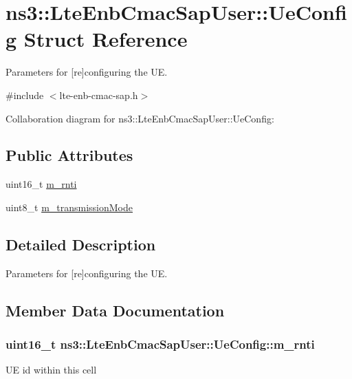 \hypertarget{structns3_1_1LteEnbCmacSapUser_1_1UeConfig}{}\section{ns3\+:\+:Lte\+Enb\+Cmac\+Sap\+User\+:\+:Ue\+Config Struct Reference}
\label{structns3_1_1LteEnbCmacSapUser_1_1UeConfig}


Parameters for \mbox{[}re\mbox{]}configuring the UE.  




{\ttfamily \#include $<$lte-\/enb-\/cmac-\/sap.\+h$>$}



Collaboration diagram for ns3\+:\+:Lte\+Enb\+Cmac\+Sap\+User\+:\+:Ue\+Config\+:
\subsection*{Public Attributes}
\begin{DoxyCompactItemize}
\item 
uint16\+\_\+t \hyperlink{structns3_1_1LteEnbCmacSapUser_1_1UeConfig_a763c88aae37375654fda021763d7ec85}{m\+\_\+rnti}
\item 
uint8\+\_\+t \hyperlink{structns3_1_1LteEnbCmacSapUser_1_1UeConfig_af5014d0254a641bc8bf84154aa4853e4}{m\+\_\+transmission\+Mode}
\end{DoxyCompactItemize}


\subsection{Detailed Description}
Parameters for \mbox{[}re\mbox{]}configuring the UE. 

\subsection{Member Data Documentation}
\subsubsection[{\texorpdfstring{m\+\_\+rnti}{m_rnti}}]{\setlength{\rightskip}{0pt plus 5cm}uint16\+\_\+t ns3\+::\+Lte\+Enb\+Cmac\+Sap\+User\+::\+Ue\+Config\+::m\+\_\+rnti}\hypertarget{structns3_1_1LteEnbCmacSapUser_1_1UeConfig_a763c88aae37375654fda021763d7ec85}{}\label{structns3_1_1LteEnbCmacSapUser_1_1UeConfig_a763c88aae37375654fda021763d7ec85}
UE id within this cell 
